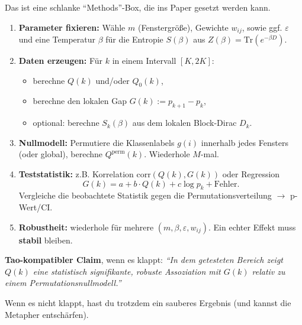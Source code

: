 \documentclass[11pt,a4paper]{article}
\theoremstyle{definition}
\begin{document}
Das ist eine schlanke ``Methods''-Box, die ins Paper gesetzt werden kann.

\begin{enumerate}
\item \textbf{Parameter fixieren:} Wähle $m$ (Fenstergröße), Gewichte $w_{ij}$, sowie ggf. $\varepsilon$ und eine Temperatur $\beta$ für die Entropie $S(\beta)$ aus $Z(\beta)=\mathrm{Tr}(e^{-\beta D})$.

\item \textbf{Daten erzeugen:} Für $k$ in einem Intervall $[K,2K]$:
   \begin{itemize}
   \item berechne $Q(k)$ und/oder $Q_0(k)$,
   \item berechne den lokalen Gap $G(k):=p_{k+1}-p_k$,
   \item optional: berechne $S_k(\beta)$ aus dem lokalen Block-Dirac $D_k$.
   \end{itemize}

\item \textbf{Nullmodell:} Permutiere die Klassenlabels $g(i)$ innerhalb jedes Fensters (oder global), berechne $Q^{\mathrm{perm}}(k)$. Wiederhole $M$-mal.

\item \textbf{Teststatistik:} z.B. Korrelation $\mathrm{corr}(Q(k),G(k))$ oder Regression
   \[
   G(k)=a+b \cdot Q(k)+c\log p_k+\text{Fehler}.
   \]
   Vergleiche die beobachtete Statistik gegen die Permutationsverteilung $\to$ p-Wert/CI.

\item \textbf{Robustheit:} wiederhole für mehrere $(m,\beta,\varepsilon,w_{ij})$. Ein echter Effekt muss \textbf{stabil} bleiben.
\end{enumerate}

\textbf{Tao-kompatibler Claim}, wenn es klappt: \emph{``In dem getesteten Bereich zeigt $Q(k)$ eine statistisch signifikante, robuste Assoziation mit $G(k)$ relativ zu einem Permutationsnullmodell.''}

Wenn es nicht klappt, hast du trotzdem ein sauberes Ergebnis (und kannst die Metapher entschärfen).
\end{document}
